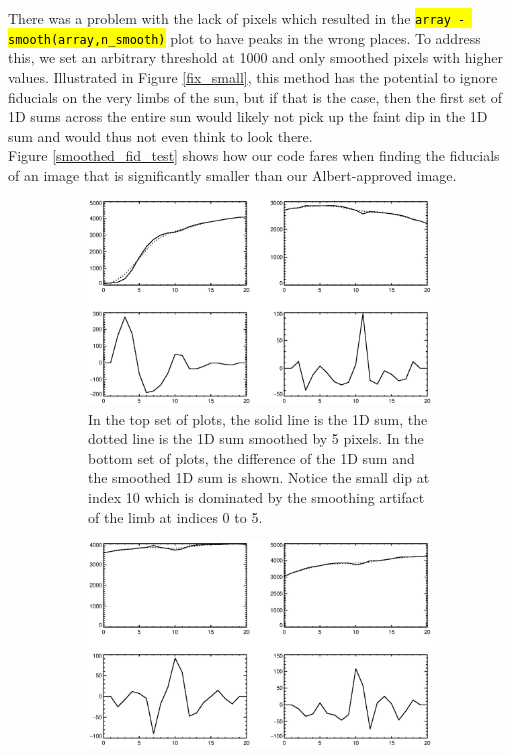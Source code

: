 \documentclass[10pt]{scrartcl}
\begin{document}
There was a problem with the lack of pixels which resulted in the \hl{\texttt{array - smooth(array,n\_smooth)}} plot to have peaks in the wrong places. To address this, we set an arbitrary threshold at 1000 and only smoothed pixels with higher values. Illustrated in Figure \ref{fix_small}, this method has the potential to ignore fiducials on the very limbs of the sun, but if that is the case, then the first set of 1D sums across the entire sun would likely not pick up the faint dip in the 1D sum and would thus not even think to look there. \\
\indent Figure \ref{smoothed_fid_test} shows how our code fares when finding the fiducials of an image that is significantly smaller than our Albert-approved image.

\begin{figure}[!ht]
    \begin{subfigure}[b]{.5\linewidth}
        \centering
        \includegraphics[width=\linewidth]{../plots_tables_images/small_image.eps}
        \caption{In the top set of plots, the solid line is the 1D sum, the dotted line is the 1D sum smoothed by 5 pixels. In the bottom set of plots, the difference of the 1D sum and the smoothed 1D sum is shown. Notice the small dip at index 10 which is dominated by the smoothing artifact of the limb at indices 0 to 5.}
        \label{small_image}
    \end{subfigure}
    \begin{subfigure}[b]{.5\linewidth}
        \centering
        \includegraphics[width=\linewidth]{../plots_tables_images/small_image_fixed.eps}

\end{subfigure}
\end{figure}
\end{document}
